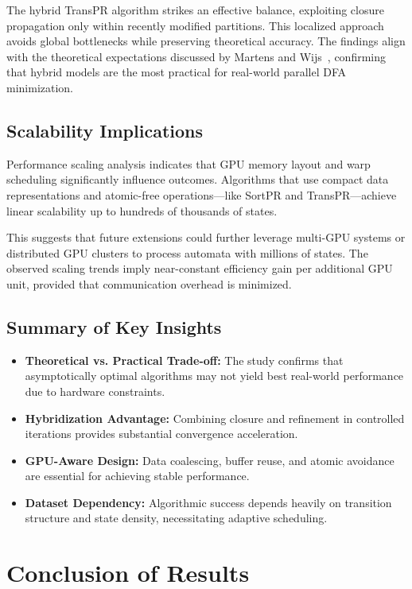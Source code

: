 The hybrid TransPR algorithm strikes an effective balance, exploiting closure propagation only within recently modified partitions. This localized approach avoids global bottlenecks while preserving theoretical accuracy. The findings align with the theoretical expectations discussed by Martens and Wijs~\cite{martenswijs2024}, confirming that hybrid models are the most practical for real-world parallel DFA minimization.

\subsection{Scalability Implications}

Performance scaling analysis indicates that GPU memory layout and warp scheduling significantly influence outcomes. Algorithms that use compact data representations and atomic-free operations—like SortPR and TransPR—achieve linear scalability up to hundreds of thousands of states.

This suggests that future extensions could further leverage multi-GPU systems or distributed GPU clusters to process automata with millions of states. The observed scaling trends imply near-constant efficiency gain per additional GPU unit, provided that communication overhead is minimized.

\subsection{Summary of Key Insights}

\begin{itemize}
    \item \textbf{Theoretical vs. Practical Trade-off:} The study confirms that asymptotically optimal algorithms may not yield best real-world performance due to hardware constraints.
    \item \textbf{Hybridization Advantage:} Combining closure and refinement in controlled iterations provides substantial convergence acceleration.
    \item \textbf{GPU-Aware Design:} Data coalescing, buffer reuse, and atomic avoidance are essential for achieving stable performance.
    \item \textbf{Dataset Dependency:} Algorithmic success depends heavily on transition structure and state density, necessitating adaptive scheduling.
\end{itemize}

\section{Conclusion of Results}

